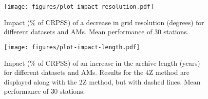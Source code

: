 \documentclass{ametsoc}
\begin{document}
\begin{figure}[t]
	\noindent\texttt{[image: figures/plot-impact-resolution.pdf]}\\
	\caption{Impact (\% of CRPSS) of a decrease in grid resolution (degrees) for different datasets and AMs. Mean performance of 30 stations.}
	\label{fig:plot_impact_resolution}
\end{figure}

\begin{figure}[t]
	\noindent\texttt{[image: figures/plot-impact-length.pdf]}\\
	\caption{Impact (\% of CRPSS) of an increase in the archive length (years) for different datasets and AMs. Results for the 4Z method are displayed along with the 2Z method, but with dashed lines. Mean performance of 30 stations.}
	\label{fig:plot_impact_length}
\end{figure}
\end{document}
